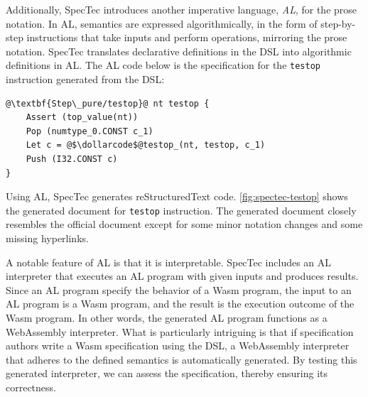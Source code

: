 Additionally, SpecTec introduces another imperative language, \textit{AL}, for
the prose notation.
In AL, semantics are expressed algorithmically, in the form of step-by-step
instructions that take inputs and perform operations, mirroring the prose notation.
SpecTec translates declarative definitions in the DSL into algorithmic
definitions in AL.
The AL code below is the specification for the \texttt{testop} instruction
generated from the DSL:
\begin{lstlisting}[style=al]
@\textbf{Step\_pure/testop}@ nt testop {
    Assert (top_value(nt))
    Pop (numtype_0.CONST c_1)
    Let c = @$\dollarcode$@testop_(nt, testop, c_1)
    Push (I32.CONST c)
}
\end{lstlisting}
Using AL, SpecTec generates reStructuredText code.
\cref{fig:spectec-testop} shows the generated document for \texttt{testop}
instruction.
The generated document closely resembles the official document except for some
minor notation changes and some missing hyperlinks.


A notable feature of AL is that it is interpretable.
SpecTec includes an AL interpreter that executes an AL program with given inputs
and produces results.
Since an AL program specify the behavior of a Wasm program, the input to an AL
program is a Wasm program, and the result is the execution outcome of the Wasm
program.
In other words, the generated AL program functions as a WebAssembly interpreter.
What is particularly intriguing is that if specification authors write a Wasm
specification using the DSL, a WebAssembly interpreter that adheres to the
defined semantics is automatically generated.
By testing this generated interpreter, we can assess the specification,
thereby ensuring its correctness.
